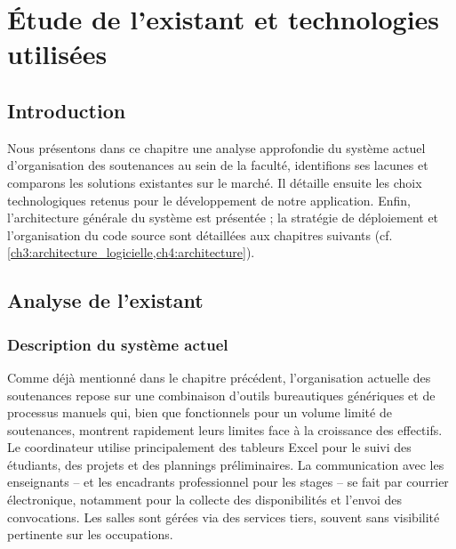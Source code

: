 \newpage
\section{Étude de l'existant et technologies utilisées}
\label{ch2}

\subsection{Introduction}
\label{ch2:intro}

Nous présentons dans ce chapitre une analyse approfondie du système actuel d'organisation des soutenances au sein de la faculté, identifions ses lacunes et comparons les solutions existantes sur le marché. Il détaille ensuite les choix technologiques retenus pour le développement de notre application. Enfin, l'architecture générale du système est présentée ; la stratégie de déploiement et l'organisation du code source sont détaillées aux chapitres suivants (cf. \cref{ch3:architecture_logicielle,ch4:architecture}).

\subsection{Analyse de l'existant}
\label{ch2:existant}

\subsubsection{Description du système actuel}
\label{ch2:systeme_actuel}

Comme déjà mentionné dans le chapitre précédent, l'organisation actuelle des soutenances repose sur une combinaison d'outils bureautiques génériques et de processus manuels qui, bien que fonctionnels pour un volume limité de soutenances, montrent rapidement leurs limites face à la croissance des effectifs. Le coordinateur utilise principalement des tableurs Excel pour le suivi des étudiants, des projets et des plannings préliminaires. La communication avec les enseignants -- et les encadrants professionnel pour les stages -- se fait par courrier électronique, notamment pour la collecte des disponibilités et l'envoi des convocations. Les salles sont gérées via des services tiers, souvent sans visibilité pertinente sur les occupations.

